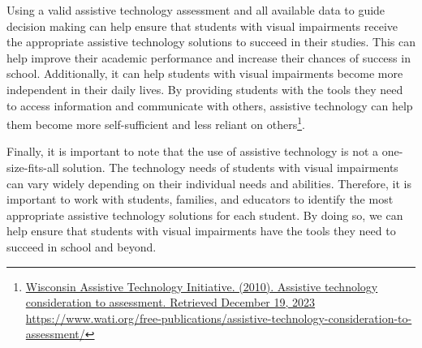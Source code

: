 Using a valid assistive technology assessment and all available data to guide decision making can help ensure that students with visual impairments receive the appropriate assistive technology solutions to succeed in their studies. This can help improve their academic performance and increase their chances of success in school. Additionally, it can help students with visual impairments become more independent in their daily lives. By providing students with the tools they need to access information and communicate with others, assistive technology can help them become more self-sufficient and less reliant on others\footnote{\raggedright \href{https://www.wati.org/free-publications/assistive-technology-consideration-to-assessment/}{Wisconsin Assistive Technology Initiative. (2010). Assistive technology consideration to assessment. Retrieved December 19, 2023} \url{https://www.wati.org/free-publications/assistive-technology-consideration-to-assessment/}}.

Finally, it is important to note that the use of assistive technology is not a one-size-fits-all solution. The technology needs of students with visual impairments can vary widely depending on their individual needs and abilities. Therefore, it is important to work with students, families, and educators to identify the most appropriate assistive technology solutions for each student. By doing so, we can help ensure that students with visual impairments have the tools they need to succeed in school and beyond.

